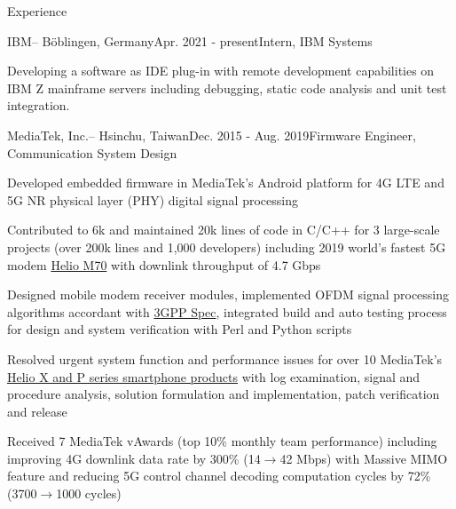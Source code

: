 \documentclass{resume} %
\begin{document}
\begin{rSection}{Experience}

\begin{rSubsection}{IBM}{--  Böblingen, Germany}{Apr. 2021 - present}{Intern, IBM Systems}
\item Developing a software as IDE plug-in with remote development capabilities on IBM Z mainframe servers including debugging, static code analysis and unit test integration. 
\end{rSubsection}

\begin{rSubsection}{MediaTek, Inc.}{--  Hsinchu, Taiwan}{Dec. 2015 - Aug. 2019}{Firmware Engineer, Communication System Design}

\item Developed embedded firmware in MediaTek’s Android platform for 4G LTE and 5G NR physical layer (PHY) digital signal processing
\item Contributed to 6k and maintained 20k lines of code in C/C++ for 3 large-scale projects (over 200k lines and 1,000 developers) including 2019 world’s fastest 5G modem  \href{https://www.mediatek.com/blog/heres-5gs-real-speed-live-connection-demo
}{Helio M70} with downlink throughput of 4.7 Gbps
\item Designed mobile modem receiver modules, implemented OFDM signal processing algorithms accordant with  \href{https://www.3gpp.org/specifications}{3GPP Spec}, integrated build and auto testing process for design and system verification with Perl and Python scripts 
\item Resolved urgent system function and performance issues for over 10 MediaTek’s \href{https://www.mediatek.com/products/smartphones}{Helio X and P series smartphone products} with log examination, signal and procedure analysis, solution formulation and implementation, patch verification and release

\item Received 7 MediaTek vAwards (top 10\% monthly team performance) including  improving 4G downlink data rate by 300\% (14$\rightarrow$42 Mbps) with Massive MIMO feature and reducing 5G control channel decoding computation  cycles by 72\% (3700$\rightarrow$1000 cycles)

\end{rSubsection}

\end{rSection}
\end{document}
